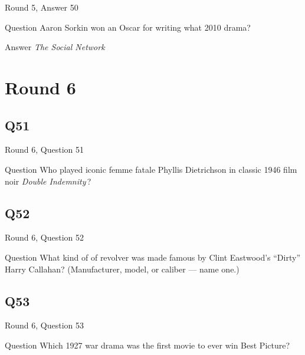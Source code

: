 \documentclass[11pt]{beamer}
\begin{document}
\begin{frame}[t]{Round 5, Answer 50}
\vspace{2em}
\begin{block}{Question}
Aaron Sorkin won an Oscar for writing what 2010 drama?
\end{block}
\pause{}
\begin{block}{Answer}
\emph{The Social Network}
\end{block}
\end{frame}
    

\section{Round 6}
    

\subsection*{Q51}
\begin{frame}[t]{Round 6, Question 51}
\vspace{2em}
\begin{block}{Question}
Who played iconic femme fatale Phyllis Dietrichson in classic 1946 film noir \emph{Double Indemnity}\,?
\end{block}
\end{frame}
    

\subsection*{Q52}
\begin{frame}[t]{Round 6, Question 52}
\vspace{2em}
\begin{block}{Question}
What kind of of revolver was made famous by Clint Eastwood's ``Dirty'' Harry Callahan? (Manufacturer, model, or caliber — name one.)
\end{block}
\end{frame}
    

\subsection*{Q53}
\begin{frame}[t]{Round 6, Question 53}
\vspace{2em}
\begin{block}{Question}
Which 1927 war drama was the first movie to ever win Best Picture?
\end{block}
\end{frame}
    
\end{document}
